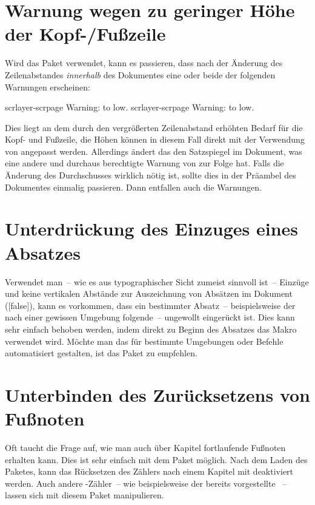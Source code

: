 \section{Warnung wegen zu geringer Höhe der Kopf-/Fußzeile}
\label{sec:tips:headline}
Wird das Paket  verwendet, kann es passieren, dass nach der 
Änderung des Zeilenabstandes \emph{innerhalb} des Dokumentes eine oder beide 
der folgenden Warnungen erscheinen:
%
\begin{quoting}
\begin{Code}
scrlayer-scrpage Warning: \headheight to low.
scrlayer-scrpage Warning: \footheight to low.
\end{Code}
\end{quoting}
%
Dies liegt an dem durch den vergrößerten Zeilenabstand erhöhten Bedarf für die
Kopf- und Fußzeile, die Höhen können in diesem Fall direkt mit der Verwendung 
von  angepasst werden. Allerdings ändert das den 
Satzspiegel im Dokument, was eine andere und durchaus berechtigte Warnung von 
 zur Folge hat. Falls die Änderung des Durchschusses wirklich 
nötig ist, sollte dies in der Präambel des Dokumentes einmalig passieren. Dann 
entfallen auch die Warnungen.



\section{Unterdrückung des Einzuges eines Absatzes}
Verwendet man~-- wie es aus typographischer Sicht zumeist sinnvoll ist~-- 
Einzüge und keine vertikalen Abstände zur Auszeichnung von Absätzen im Dokument
([false]), kann es vorkommen, dass ein bestimmter Absatz~-- 
beispielsweise der nach einer gewissen Umgebung folgende~-- ungewollt 
eingerückt ist. Dies kann sehr einfach behoben werden, indem direkt zu Beginn 
des Absatzes das Makro  verwendet wird. Möchte man das für 
bestimmte Umgebungen oder Befehle automatisiert gestalten, ist das Paket
 zu empfehlen.



\section{Unterbinden des Zurücksetzens von Fußnoten}%
\label{sec:tips:counter}
Oft taucht die Frage auf, wie man auch über Kapitel fortlaufende Fußnoten 
erhalten kann. Dies ist sehr einfach mit dem Paket  möglich. 
Nach dem Laden des Paketes, kann das Rücksetzen des Zählers nach einem Kapitel 
mit  
deaktiviert werden. Auch andere -Zähler~-- wie beispielsweise der 
bereits vorgestellte ~-- lassen sich mit diesem 
Paket manipulieren.



